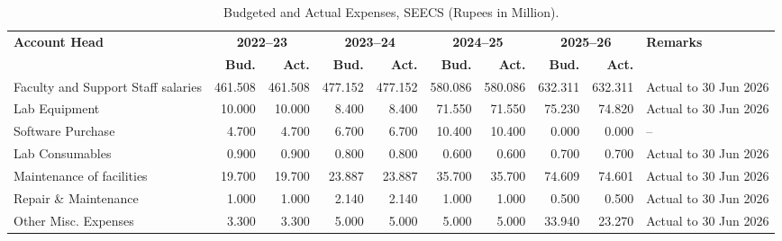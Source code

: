 \begin{landscape}
\begin{table}[H]
\centering
\caption{Budgeted and Actual Expenses, SEECS (Rupees in Million).}
\label{tab:expenses}
\begingroup\scriptsize
\setlength{\tabcolsep}{3pt}
\renewcommand{\arraystretch}{1.12}
\begin{tabular}{@{}lrrrrrrrrl@{}}
\toprule
\textbf{Account Head} & \multicolumn{2}{c}{\textbf{2022--23}} & \multicolumn{2}{c}{\textbf{2023--24}} & \multicolumn{2}{c}{\textbf{2024--25}} & \multicolumn{2}{c}{\textbf{2025--26}} & \textbf{Remarks} \\
\cmidrule(lr){2-3}\cmidrule(lr){4-5}\cmidrule(lr){6-7}\cmidrule(lr){8-9}
 & \textbf{Bud.} & \textbf{Act.} & \textbf{Bud.} & \textbf{Act.} & \textbf{Bud.} & \textbf{Act.} & \textbf{Bud.} & \textbf{Act.} & \\
\midrule
Faculty and Support Staff salaries & 461.508 & 461.508 & 477.152 & 477.152 & 580.086 & 580.086 & 632.311 & 632.311 & Actual to 30 Jun 2026 \\
Lab Equipment & 10.000 & 10.000 & 8.400 & 8.400 & 71.550 & 71.550 & 75.230 & 74.820 & Actual to 30 Jun 2026 \\
Software Purchase & 4.700 & 4.700 & 6.700 & 6.700 & 10.400 & 10.400 & 0.000 & 0.000 & -- \\
Lab Consumables & 0.900 & 0.900 & 0.800 & 0.800 & 0.600 & 0.600 & 0.700 & 0.700 & Actual to 30 Jun 2026 \\
Maintenance of facilities & 19.700 & 19.700 & 23.887 & 23.887 & 35.700 & 35.700 & 74.609 & 74.601 & Actual to 30 Jun 2026 \\
Repair \& Maintenance & 1.000 & 1.000 & 2.140 & 2.140 & 1.000 & 1.000 & 0.500 & 0.500 & Actual to 30 Jun 2026 \\
Other Misc. Expenses & 3.300 & 3.300 & 5.000 & 5.000 & 5.000 & 5.000 & 33.940 & 23.270 & Actual to 30 Jun 2026 \\
\bottomrule
\end{tabular}
\endgroup
\end{table}
\end{landscape}